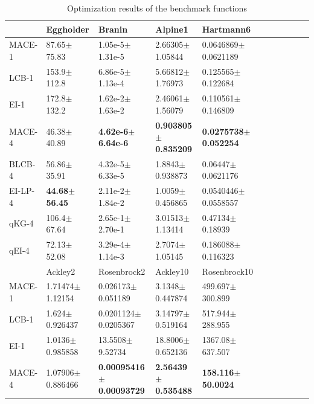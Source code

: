 \begin{table}[!htb]
    \centering
    \caption{Optimization results of the benchmark functions}
    \label{tab:result_analytical}
    \begin{tabular}{lllllllllll}
        \toprule
                & Eggholder                &  Branin              &  Alpine1              & Hartmann6                   \\ \midrule
        MACE-1  & 87.65$\pm$75.83          &  1.05e-5$\pm$1.31e-5          & 2.66305$\pm$1.05844            & 0.0646869$\pm$0.0621189 \\
        LCB-1   & 153.9$\pm$112.8          &  6.86e-5$\pm$1.13e-4          & 5.66812$\pm$1.76973            & 0.125565$\pm$0.122684   \\
        EI-1    & 172.8$\pm$132.2          &  1.62e-2$\pm$1.63e-2          & 2.46061$\pm$1.56079            & 0.110561$\pm$0.146809   \\
        MACE-4  & 46.38$\pm$40.89          &  \textbf{4.62e-6$\pm$6.64e-6} & \textbf{0.903805$\pm$0.835209} & \textbf{0.0275738$\pm$0.052254}  \\
        BLCB-4  & 56.86$\pm$35.91          &  4.32e-5$\pm$6.33e-5          & 1.8843$\pm$0.938873            & 0.06447$\pm$0.0621176   \\
        EI-LP-4 & \textbf{44.68$\pm$56.45} &  2.11e-2$\pm$1.84e-2          & 1.0059$\pm$0.456865            & 0.0540446$\pm$0.0558557 \\
        qKG-4   & 106.4$\pm$67.64          &  2.65e-1$\pm$2.70e-1          & 3.01513$\pm$1.13414            & 0.47134$\pm$0.18939     \\
        qEI-4   & 72.13$\pm$52.08          &  3.29e-4$\pm$1.14e-3          & 2.7074$\pm$1.05145             & 0.186088$\pm$0.116323   \\
        \hline
                & Ackley2                       &  Rosenbrock2               & Ackley10              & Rosenbrock10        \\ \midrule
        MACE-1  & 1.71474$\pm$1.12154           &  0.026173$\pm$0.051189              & 3.1348$\pm$0.447874           & 499.697$\pm$300.899 \\
        LCB-1   & 1.624$\pm$0.926437            &  0.0201124$\pm$0.0205367            & 3.14797$\pm$0.519164          & 517.944$\pm$288.955 \\
        EI-1    & 1.0136$\pm$0.985858           &  13.5508$\pm$9.52734                & 18.8006$\pm$0.652136          & 1367.08$\pm$637.507 \\
        MACE-4  & 1.07906$\pm$0.886466          &  \textbf{0.00095416$\pm$0.00093729} & \textbf{2.56439$\pm$0.535488} & \textbf{158.116$\pm$50.0024} \\

\end{tabular}
\end{table}
